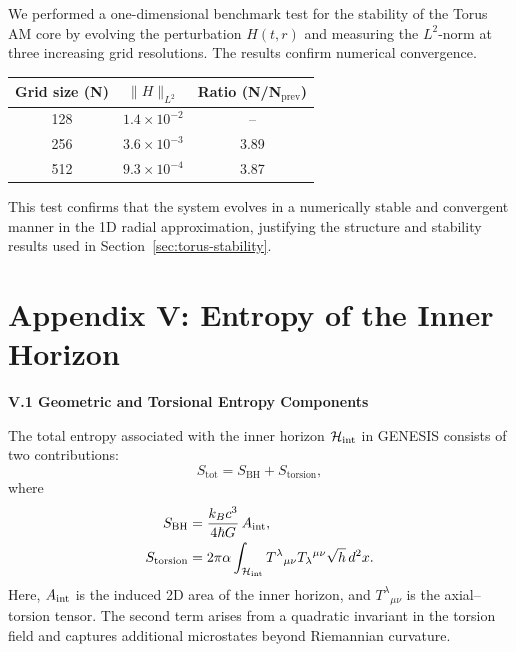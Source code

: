 \documentclass{article}
\begin{document}
We performed a one-dimensional benchmark test for the stability of the Torus AM core by evolving the perturbation \(H(t,r)\) and measuring the $L^2$-norm at three increasing grid resolutions. The results confirm numerical convergence.

\begin{center}
\begin{tabular}{|c|c|c|}
\hline
\textbf{Grid size (N)} & \(\|H\|_{L^2}\) & \textbf{Ratio (N/N\(_{\text{prev}}\))} \\
\hline
128 & \(1.4 \times 10^{-2}\) & – \\
256 & \(3.6 \times 10^{-3}\) & 3.89 \\
512 & \(9.3 \times 10^{-4}\) & 3.87 \\
\hline
\end{tabular}
\end{center}

This test confirms that the system evolves in a numerically stable and convergent manner in the 1D radial approximation, justifying the structure and stability results used in Section~\ref{sec:torus-stability}.




\section*{Appendix V: Entropy of the Inner Horizon}
\label{app:inner_entropy}

\vspace{1em}
\noindent\textbf{V.1 Geometric and Torsional Entropy Components}

The total entropy associated with the inner horizon $\mathcal H_{\rm int}$ in GENESIS consists of two contributions:
\begin{equation}
S_{\mathrm{tot}} = S_{\mathrm{BH}} + S_{\mathrm{torsion}},
\end{equation}
where
\begin{align}
S_{\mathrm{BH}} &= \frac{k_B c^3}{4 \hbar G} \, A_{\rm int}, \\
S_{\mathrm{torsion}} &= 2\pi \alpha \int_{\mathcal H_{\rm int}} T^{\lambda}{}_{\mu\nu} T_{\lambda}{}^{\mu\nu} \sqrt{h} \, d^2x.
\end{align}
Here, $A_{\rm int}$ is the induced 2D area of the inner horizon, and $T^{\lambda}{}_{\mu\nu}$ is the axial–torsion tensor. The second term arises from a quadratic invariant in the torsion field and captures additional microstates beyond Riemannian curvature.
\end{document}
